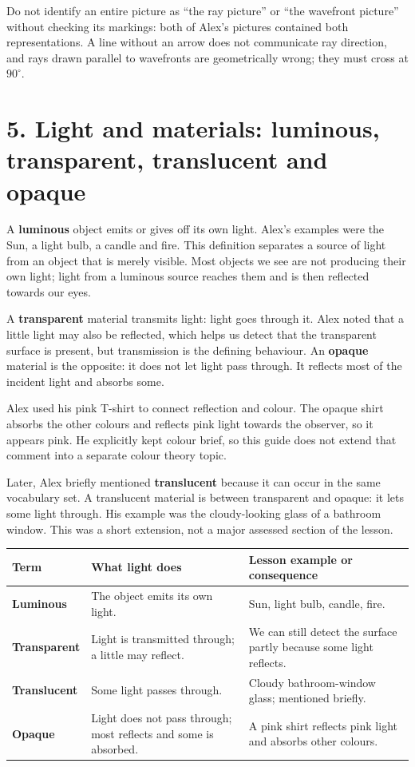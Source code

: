 \documentclass[11pt,a4paper]{article}
\begin{document}
\begin{mistakebox}
Do not identify an entire picture as ``the ray picture'' or ``the wavefront picture'' without checking its markings: both of Alex's pictures contained both representations. A line without an arrow does not communicate ray direction, and rays drawn parallel to wavefronts are geometrically wrong; they must cross at $90^\circ$.
\end{mistakebox}

\section*{5. Light and materials: luminous, transparent, translucent and opaque}
A \textbf{luminous} object emits or gives off its own light. Alex's examples were the Sun, a light bulb, a candle and fire. This definition separates a source of light from an object that is merely visible. Most objects we see are not producing their own light; light from a luminous source reaches them and is then reflected towards our eyes.

A \textbf{transparent} material transmits light: light goes through it. Alex noted that a little light may also be reflected, which helps us detect that the transparent surface is present, but transmission is the defining behaviour. An \textbf{opaque} material is the opposite: it does not let light pass through. It reflects most of the incident light and absorbs some.

Alex used his pink T-shirt to connect reflection and colour. The opaque shirt absorbs the other colours and reflects pink light towards the observer, so it appears pink. He explicitly kept colour brief, so this guide does not extend that comment into a separate colour theory topic.

Later, Alex briefly mentioned \textbf{translucent} because it can occur in the same vocabulary set. A translucent material is between transparent and opaque: it lets some light through. His example was the cloudy-looking glass of a bathroom window. This was a short extension, not a major assessed section of the lesson.

\begin{tabularx}{\linewidth}{>{\bfseries}p{.18\linewidth}Y Y}
\toprule
Term & What light does & Lesson example or consequence\\
\midrule
Luminous & The object emits its own light. & Sun, light bulb, candle, fire.\\
Transparent & Light is transmitted through; a little may reflect. & We can still detect the surface partly because some light reflects.\\
Translucent & Some light passes through. & Cloudy bathroom-window glass; mentioned briefly.\\
Opaque & Light does not pass through; most reflects and some is absorbed. & A pink shirt reflects pink light and absorbs other colours.\\
\bottomrule
\end{tabularx}
\end{document}
